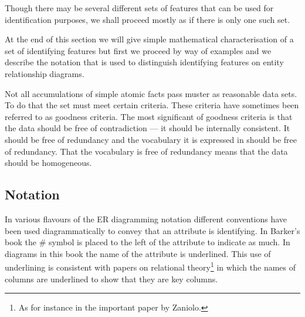 Though there may be several different sets of features that can be used for identification purposes, we shall proceed mostly as if there is only one such set.

At the end of this section we will give simple mathematical characterisation of a set of identifying features but first
we proceed by way of examples 
and we describe the notation that is used to distinguish identifying features on entity relationship  diagrams.

\begin{notebox}
Not all accumulations of simple atomic facts pass muster as reasonable data sets. To do that the set must meet certain criteria. These criteria have sometimes been referred to as goodness criteria.
The most significant of goodness criteria is that the data should be free of contradiction --- it should be internally consistent. It should be free of redundancy and the vocabulary it is expressed in should be free of redundancy. That the vocabulary is free of redundancy means that the data should be homogeneous. 
\end{notebox}

\subsection{Notation}
\mynote
In various flavours of the ER diagramming notation different conventions have been used diagrammatically to convey that an attribute is identifying. In Barker's book the \# symbol is placed to the left of the attribute to indicate as much. In diagrams in this book the name of the attribute is underlined. This use of underlining is consistent with papers on relational theory\footnote{As for instance in the important paper by Zaniolo.} in which  the names of columns are underlined to show that they are key columns.

